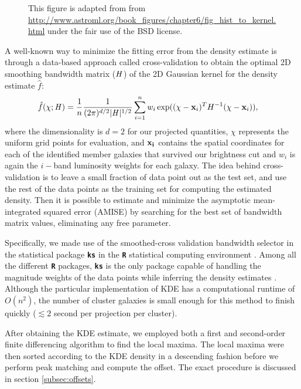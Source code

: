 \begin{figure*}
	\caption{This figure is adapted from \citealt{Vanderplas2012} from
\href{http://www.astroml.org/book\_figures/chapter6/fig\_hist\_to\_kernel.html}{http://www.astroml.org/book\_figures/chapter6/fig\_hist\_to\_kernel.html}
under the fair use of the BSD license. \label{fig:bias_variance_tradeoff} }
\end{figure*}
A well-known way to minimize the fitting error from the density estimate is through
a data-based approach called cross-validation to obtain 
the optimal 2D smoothing
bandwidth matrix ($\mathbf{\it H}$) of the 2D Gaussian kernel for the
density estimate $\hat{f}$:
\begin{align}
	\hat{f}(\chi; \mathbf{\it H}) &= \frac{1}{n} \frac{1}{(2\pi)^{d/2}|\mathbf{\it H}|^{1/2}}
	\sum_{i=1}^n w_i \exp((\chi-{\bf x}_i)^T H^{-1} (\chi-{\bf x}_i)),
	\label{eq:cross_validated_bandwidth}
\end{align}
where the dimensionality is $d=2$ for our projected quantities,
$\chi$ represents the uniform grid points for evaluation, and 
$\bf{x}_i$ contains the spatial coordinates for each of the identified member 
galaxies that survived our brightness cut and $w_i$ is again the $i-$band
luminosity weights for each galaxy.
The idea behind cross-validation is to leave a small fraction of data point 
out as the test set, and use the rest of the data points as 
the training set for computing the estimated density.
Then it is possible to estimate and minimize the asymptotic mean-integrated squared error
(AMISE)  by searching
for the best set of bandwidth matrix values, eliminating any free parameter. 

Specifically, we made use of the smoothed-cross validation \citep{Hall1992} 
bandwidth selector in the statistical package {\bf \texttt{ks}} \citep{Duong2007} 
in the {\bf \texttt{R}} statistical computing environment \citep{R_core}. 
Among all the different {\bf \texttt{R}} packages, {\bf \texttt{ks}} is the
only package capable of handling the magnitude weights of the data points 
while inferring the density estimates \citep{Deng2011}. 
Although the particular implementation of KDE has a computational runtime of $O(n^2)$, 
the number of cluster galaxies is
small enough for this method to finish quickly ($\lesssim 2$ second per
projection per cluster). 

After obtaining the KDE estimate, we employed both a first and second-order  
finite differencing algorithm to find the local maxima.  
The local maxima were then sorted according to the KDE density in a descending
fashion before we perform peak matching and compute the offset. The exact
procedure is discussed in section \ref{subsec:offsets}. 

